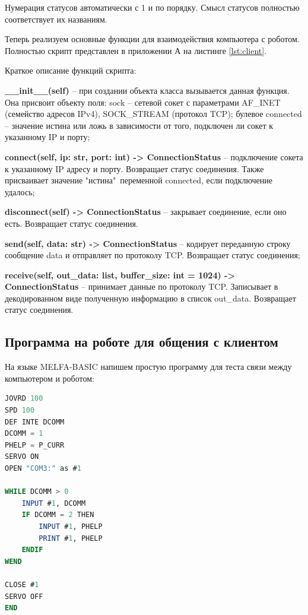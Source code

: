 \documentclass[a4paper,14pt]{extarticle}
\begin{document}
Нумерация статусов автоматически с 1 и по порядку.
Смысл статусов полностью соответствует их названиям.


Теперь реализуем основные функции для взаимодействия компьютера с роботом.
Полностью скрипт представлен в приложении А на листинге \ref{lst:client}.


Краткое описание функций скрипта:
\begin{compactitem}
    \item \textbf{\_\_init\_\_(self)} -- при создании объекта класса вызывается
    данная функция. Она присвоит объекту поля: sock -- сетевой сокет с параметрами
    AF\_INET (семейство адресов IPv4), SOCK\_STREAM (протокол TCP);
    булевое connected -- значение истина или ложь в зависимости от
    того, подключен ли сокет к указанному IP и порту;
    \item \textbf{connect(self, ip: str, port: int) -> ConnectionStatus} --
    подключение сокета к указанному IP адресу и порту. Возвращает
    статус соединения. Также присваивает значение "истина"\,
    переменной connected, если подключение удалось;
    \item \textbf{disconnect(self) -> ConnectionStatus} -- закрывает
    соединение, если оно есть. Возвращает статус соединения.
    \item \textbf{send(self, data: str) -> ConnectionStatus} --
    кодирует переданную строку сообщение data и отправляет по
    протоколу TCP. Возвращает статус соединения;
    \item \textbf{receive(self, out\_data: list, buffer\_size: int = 1024) -> ConnectionStatus}
    -- принимает данные по протоколу TCP. Записывает в декодированном виде
    полученную информацию в список out\_data. Возвращает статус соединения.
\end{compactitem}


\subsection{Программа на роботе для общения с клиентом}
На языке MELFA-BASIC напишем простую программу для теста
связи между компьютером и роботом:
\begin{lstlisting}[language=Basic, label=lst:mbtest, caption={Простая программа на роботе для проверки связи с клиентом.}]
JOVRD 100
SPD 100
DEF INTE DCOMM
DCOMM = 1
PHELP = P_CURR
SERVO ON
OPEN "COM3:" as #1

WHILE DCOMM > 0
    INPUT #1, DCOMM
    IF DCOMM = 2 THEN
        INPUT #1, PHELP
        PRINT #1, PHELP
    ENDIF
WEND

CLOSE #1
SERVO OFF
END
\end{lstlisting}
\end{document}
